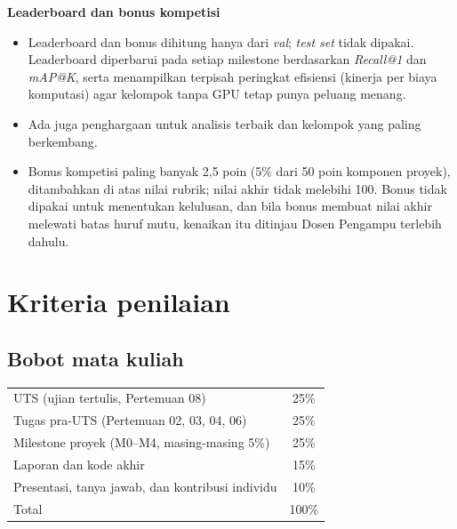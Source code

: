 \documentclass[12pt, a4paper]{article}
\begin{document}
\begin{callout}[ctpGreen]
\textbf{\color{ctpGreen}Leaderboard dan bonus kompetisi}
\begin{itemize}
  \item Leaderboard dan bonus dihitung hanya dari \emph{val}; \emph{test set} tidak dipakai. Leaderboard diperbarui pada setiap milestone berdasarkan \emph{Recall@1} dan \emph{mAP@K}, serta menampilkan terpisah peringkat efisiensi (kinerja per biaya komputasi) agar kelompok tanpa GPU tetap punya peluang menang.
  \item Ada juga penghargaan untuk analisis terbaik dan kelompok yang paling berkembang.
  \item Bonus kompetisi paling banyak 2,5 poin (5\% dari 50 poin komponen proyek), ditambahkan di atas nilai rubrik; nilai akhir tidak melebihi 100. Bonus tidak dipakai untuk menentukan kelulusan, dan bila bonus membuat nilai akhir melewati batas huruf mutu, kenaikan itu ditinjau Dosen Pengampu terlebih dahulu.
\end{itemize}
\end{callout}

\clearpage
\section{Kriteria penilaian}\label{sec:evaluation}

\subsection{Bobot mata kuliah}

\renewcommand{\arraystretch}{1.35}
\begin{center}\small
\begin{tabular}{|L{10.4cm}|c|}
  \hline
   &  \\
  \hline
  UTS (ujian tertulis, Pertemuan 08) & 25\% \\
  \hline
  Tugas pra-UTS (Pertemuan 02, 03, 04, 06) & 25\% \\
  \hline
  Milestone proyek (M0--M4, masing-masing 5\%) & 25\% \\
  \hline
  Laporan dan kode akhir & 15\% \\
  \hline
  Presentasi, tanya jawab, dan kontribusi individu & 10\% \\
  \hline
  Total & 100\% \\
  \hline
\end{tabular}
\end{center}
\end{document}
